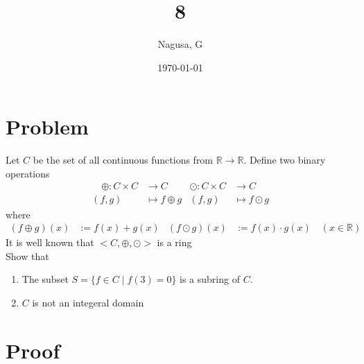 \documentclass[11pt, a4paper]{article}
\title{8}
\author{Nagusa, G}
\date{\today}
\begin{document}
\maketitle

\section*{Problem}
Let $C$ be the set of all continuous functions from $\mathbb{R} \to \mathbb{R}$. Define two binary operations
\begin{align*}
    \quad \oplus : C \times C &\to C & \odot : C \times C &\to C \\
    (f, g) &\mapsto f \oplus g & (f, g) &\mapsto f \odot g
\end{align*}
where
\begin{align*}
    (f \oplus g)(x) &:= f(x) + g(x) & (f \odot g)(x) &:= f(x) \cdot g(x) \quad (x\in \mathbb{R})
\end{align*}
It is well known that $<C,\oplus,\odot>$ is a ring\\
Show that
\begin{enumerate}
    \item The subset $S = \{f \in C \mid f(3)=0\}$ is a subring of $C$.
    \item $C$ is not an integeral domain
\end{enumerate}

\section*{Proof}
\end{document}
